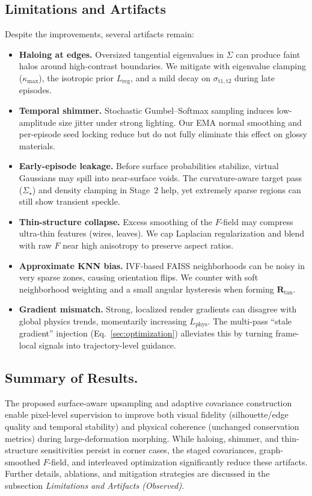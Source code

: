 \subsection{Limitations and Artifacts}
Despite the improvements, several artifacts remain:

\begin{itemize}
    \item \textbf{Haloing at edges.} Oversized tangential eigenvalues in $\Sigma$ can produce faint halos around high-contrast boundaries. We mitigate with eigenvalue clamping ($\kappa_{\max}$), the isotropic prior $L_{\text{reg}}$, and a mild decay on $\sigma_{\mathrm{t1,t2}}$ during late episodes.
    \item \textbf{Temporal shimmer.} Stochastic Gumbel--Softmax sampling induces low-amplitude size jitter under strong lighting. Our EMA normal smoothing and per-episode seed locking reduce but do not fully eliminate this effect on glossy materials.
    \item \textbf{Early-episode leakage.} Before surface probabilities stabilize, virtual Gaussians may spill into near-surface voids. The curvature-aware target pass ($\Sigma_\star$) and density clamping in Stage~2 help, yet extremely sparse regions can still show transient speckle.
    \item \textbf{Thin-structure collapse.} Excess smoothing of the $F$-field may compress ultra-thin features (wires, leaves). We cap Laplacian regularization and blend with raw $F$ near high anisotropy to preserve aspect ratios.
    \item \textbf{Approximate KNN bias.} IVF-based FAISS neighborhoods can be noisy in very sparse zones, causing orientation flips. We counter with soft neighborhood weighting and a small angular hysteresis when forming $\mathbf{R}_{\text{tan}}$.
    \item \textbf{Gradient mismatch.} Strong, localized render gradients can disagree with global physics trends, momentarily increasing $L_{\text{phys}}$. The multi-pass “stale gradient” injection (Eq.~\ref{sec:optimization}) alleviates this by turning frame-local signals into trajectory-level guidance.
\end{itemize}

\subsection{Summary of Results.}
    The proposed surface-aware upsampling and adaptive covariance construction enable pixel-level supervision to improve both visual fidelity (silhouette/edge quality and temporal stability) and physical coherence (unchanged conservation metrics) during large-deformation morphing. While haloing, shimmer, and thin-structure sensitivities persist in corner cases, the staged covariances, graph-smoothed $F$-field, and interleaved optimization significantly reduce these artifacts. Further details, ablations, and mitigation strategies are discussed in the subsection \emph{Limitations and Artifacts (Observed)}.
    